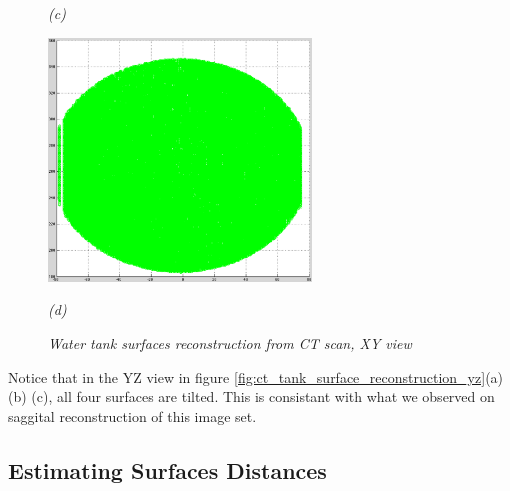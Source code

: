 \begin{figure}[htb]
\begin{minipage}[t]{2.75in}
    \centerline{\emph{(c)}}
  \end{minipage}\medskip
  \begin{minipage}[t]{2.75in}
    \centering
    \centerline{\mbox{\includegraphics[width=2.75in]{data_extraction/images/surface_plane/inferior_outside/xy.eps}}}
    \centerline{\emph{(d)}}
  \end{minipage}
  \caption{\emph{Water tank surfaces reconstruction from CT scan, XY view}}
  \label{fig:ct_tank_surface_reconstruction_xy}
\end{figure}

Notice that in the YZ view in figure \ref{fig:ct_tank_surface_reconstruction_yz}(a) (b) (c), 
all four surfaces are tilted. This is consistant with what we observed on saggital reconstruction 
of this image set. 

\subsection{Estimating Surfaces Distances}
